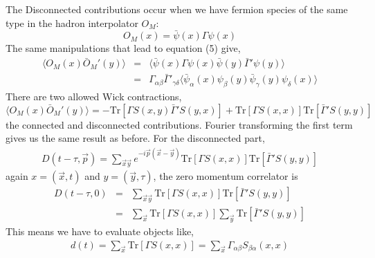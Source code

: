 \documentclass[3p,preprint]{elsarticle}
\begin{document}
The Disconnected contributions occur when we have fermion species of the same type in the hadron interpolator $O_M$:
\begin{equation}
O_M(x) = \bar{ \psi } (x) \Gamma \psi(x)
\end{equation}
The same manipulations that lead to equation (5) give,
\begin{eqnarray}
\langle O_M(x) \bar{O}_M'(y) \rangle &=& \langle \bar{\psi}(x) \Gamma \psi(x) \bar{\psi}(y) \bar{ \Gamma }' \psi(y) \rangle \\
&=& \Gamma_{\alpha \beta} \bar{ \Gamma }'_{\gamma \delta} \langle \bar{\psi}_\alpha(x)  \psi_\beta(y) \bar{\psi}_\gamma(y)  \psi_\delta(x) \rangle
\end{eqnarray}
There are two allowed Wick contractions,
\begin{equation}
\langle O_M(x) \bar{O}_M'(y) \rangle = -\text{Tr}\left[ \Gamma S (x,y) \bar{ \Gamma }' S (y,x) \right] + \text{Tr}\left[ \Gamma S (x,x) \right] \text{Tr} \left[ \bar{ \Gamma }' S (y,y) \right]
\end{equation}
the connected and disconnected contributions. Fourier transforming the first term gives us the same result as before. For the disconnected
part,
\begin{eqnarray}
D(t - \tau, \vec{p}) = \sum_{\vec{x} \vec{y}} e^{-i \vec{p} (\vec{x} - \vec{y} )} \text{Tr}\left[ \Gamma S (x,x) \right] \text{Tr} \left[ \bar{ \Gamma }' S (y,y) \right]
\end{eqnarray}
again $x = (\vec{x}, t)$ and $y = (\vec{y}, \tau)$, the zero momentum correlator is
\begin{eqnarray}
D(t - \tau, 0) &=& \sum_{\vec{x} \vec{y}} \text{Tr}\left[ \Gamma S (x,x) \right] \text{Tr} \left[ \bar{ \Gamma }' S (y,y) \right] \\
 &=& \sum_{\vec{x}} \text{Tr}\left[ \Gamma S (x,x) \right] \sum_{\vec{y}} \text{Tr} \left[ \bar{ \Gamma }' S (y,y) \right]
\end{eqnarray}
This means we have to evaluate objects like,
\begin{eqnarray}
d(t) = \sum_{\vec{x}} \text{Tr}\left[ \Gamma S (x,x) \right] = \sum_{\vec{x}} \Gamma_{\alpha \beta} S_{\beta \alpha}(x,x)
\end{eqnarray}
\end{document}
